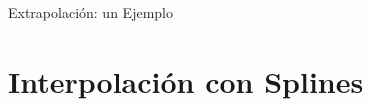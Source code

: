 \documentclass[xcolor=svgnames]{beamer} %
\theoremstyle{plain}
\theoremstyle{definition}
\begin{document}
\begin{frame}{Extrapolación: un Ejemplo}
\begin{center}
\begin{minipage}{.7\linewidth}
  \end{minipage}
  \end{center}  
\end{frame}


\section{Interpolación con Splines}
\end{document}
